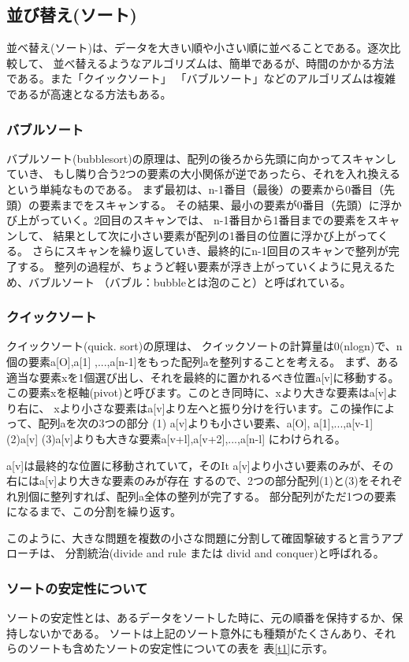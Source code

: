 \documentclass{jsarticle}
\begin{document}
\subsection{並び替え(ソート)}
  並べ替え(ソート)は、データを大きい順や小さい順に並べることである。逐次比較して、
  並べ替えるようなアルゴリズムは、簡単であるが、時間のかかる方法である。また「クイックソート」
  「バブルソート」などのアルゴリズムは複雑であるが高速となる方法もある。
  \subsubsection{バブルソート}
  バプルソート(bubblesort)の原理は、配列の後ろから先頭に向かってスキャンしていき、
  もし隣り合う2つの要素の大小関係が逆であったら、それを入れ換えるという単純なものである。
  まず最初は、n-1番目（最後）の要素から0番目（先頭）の要素までをスキャンする。
  その結果、最小の要素が0番目（先頭）に浮かび上がっていく。2回目のスキャンでは、
  n-1番目から1番目までの要素をスキャンして、
  結果として次に小さい要素が配列の1番目の位置に浮かび上がってくる。
  さらにスキャンを繰り返していき、最終的にn-1回目のスキャンで整列が完了する。
  整列の過程が、ちょうど軽い要素が浮き上がっていくように見えるため、バブルソート
  （バブル：bubbleとは泡のこと）と呼ばれている\cite{sort}。
  \subsubsection{クイックソート}
  クイックソート(quick. sort)の原理は、
  クイックソートの計算量は0(nlogn)で、n個の要素a[O],a[1] ,...,a[n-1]をもった配列aを整列することを考える。
  まず、ある適当な要素xを1個選び出し、それを最終的に置かれるべき位置a[v]に移動する。
  この要素xを枢軸(pivot)と呼びます。このとき同時に、xより大きな要素はa[v]より右に、
  xより小さな要素はa[v]より左へと振り分けを行います。この操作によって、配列aを次の3つの部分
  (1) a[v]よりも小さい要素、a[O], a[1],...,a[v-1] (2)a[v] (3)a[v]よりも大きな要素a[v+l],a[v+2],...,a[n-l]
  にわけられる。

  a[v]は最終的な位置に移動されていて，そのIt a[v]より小さい要素のみが、その右にはa[v]より大きな要素のみが存在
  するので、2つの部分配列(1)と(3)をそれぞれ別個に整列すれば、配列a全体の整列が完了する。
  部分配列がただ1つの要素になるまで、この分割を繰り返す。

  このように、大きな問題を複数の小さな問題に分割して確固撃破すると言うアプローチは、
  分割統治(divide and rule または divid and conquer)と呼ばれる\cite{sort}。


  \subsubsection{ソートの安定性について}
  ソートの安定性とは、あるデータをソートした時に、元の順番を保持するか、保持しないかである。
  ソートは上記のソート意外にも種類がたくさんあり、それらのソートも含めたソートの安定性についての表を
  表\ref{t1}に示す。
\end{document}

